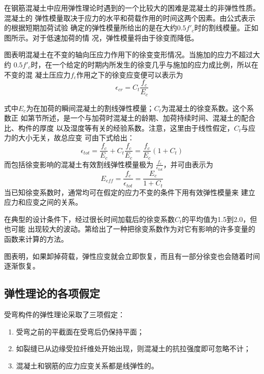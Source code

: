 \documentclass[12pt,a4paper]{book}
\begin{document}
在钢筋混凝土中应用弹性理论时遇到的一个比较大的困难是混凝土的非弹性性质。混凝土的
弹性模量取决于应力的水平和荷载作用的时间这两个因素。由公式表示的根据短期加荷试验
确定的弹性模量所给出的是在大约$0.5f'_c$时的割线模量。正如图所示。对于低速加荷的情
况，弹性模量将由于徐变而降低。

图表明混凝土在不变的轴向压应力作用下的徐变变形情况。当施加的应力不超过大约
$0.5f'_c$时，在一个给定的时期内所发生的徐变几乎与施加的应力成比例，所以在不变的混
凝土压应力$f_c$作用之下的徐变应变便可以表示为
\begin{equation}
  \label{eq:16} \epsilon_{cr}=C_t\frac{f_c}{E_c}
\end{equation}

式中$E_c$为在加荷的瞬间混凝土的割线弹性模量；$C_t$为混凝土的徐变系数。这个系数正
如第节所述，是一个与加荷时混凝土的龄期、加荷持续时间、混凝土的配合比、构件的厚度
以及湿度等有关的经验系数。注意，这里由于线性假定，$C_t$与应力的大小无关，故总应变
可由下式给出：
\begin{equation}
  \label{eq:18}
\epsilon_{tot}=\frac{f_c}{E_c}+C_t\frac{f_c}{E_c}=\frac{f_c}{E_c}(1+C_t)
\end{equation}而包括徐变影响的混凝土有效割线弹性模量极为
$\frac{f_c}{\epsilon_{tot}}$，并可由表示为
\begin{equation}
  \label{eq:19} E_{eff}=\frac{f_c}{\epsilon_{tot}}=\frac{E_c}{1+C_t}
\end{equation}当已知徐变系数时，通常均可在假定的应力不变的条件下用有效弹性模量来
建立应力和应变之间的关系。

在典型的设计条件下，经过很长时间加载后的徐变系数$C_t$的平均值为1.5到2.0，但也可能
出现较大的波动。第给出了一种把徐变系数作为对它有影响的许多变量的函数来计算的方法。

图表明，如果卸掉荷载，弹性应变就会立即恢复，而且有一部分徐变也会随着时间逐渐恢复。

\subsection{弹性理论的各项假定}

受弯构件的弹性理论采取了三项假定：
\begin{enumerate}
\item 受弯之前的平截面在受弯后仍保持平面；
\item 如裂缝已从边缘受拉纤维处开始出现，则混凝土的抗拉强度即可忽略不计；
\item 混凝土和钢筋的应力应变关系都是线弹性的。
\end{enumerate}
\end{document}
